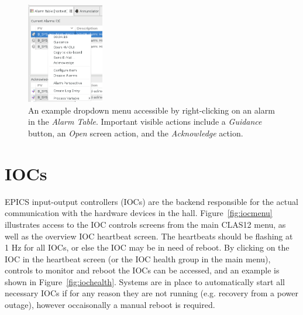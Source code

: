 \documentclass[amsmath,amssymb,notitlepage,11pt]{revtex4}
\begin{document}
\begin{figure}[htbp]\centering
  \includegraphics[width=0.3\textwidth]{pics/alarmguide}
  \caption{An example dropdown menu accessible by right-clicking on an alarm in the {\em Alarm Table}.  Important visible actions include a {\em Guidance} button, an {\em Open} screen action, and the {\em Acknowledge} action.\label{fig:alarmguide}}
\end{figure}

\section{IOCs}
EPICS input-output controllers (IOCs) are the backend responsible for the actual communication with the hardware devices in the hall.  Figure~\ref{fig:iocmenu} illustrates access to the IOC controls screens from the main CLAS12 menu, as well as the overview IOC heartbeat screen.  The heartbeats should be flashing at 1 Hz for all IOCs, or else the IOC may be in need of reboot.  By clicking on the IOC in the heartbeat screen (or the IOC health group in the main menu), controls to monitor and reboot the IOCs can be accessed, and an example is shown in Figure~\ref{fig:iochealth}.  Systems are in place to automatically start all necessary IOCs if for any reason they are not running (e.g. recovery from a power outage), however occaisonally a manual reboot is required.
\end{document}
